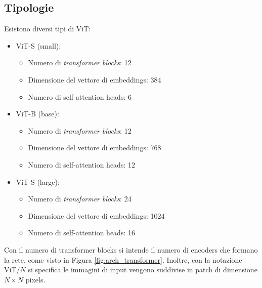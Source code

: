\subsection{Tipologie}
\label{tipologie_vit}
Esistono diversi tipi di ViT:
\begin{itemize}
    \item ViT-S (small):
    \begin{itemize}
        \item Numero di \textit{transformer blocks}: 12
        \item Dimensione del vettore di embeddings: 384
        \item Numero di self-attention heads: 6
    \end{itemize}
    \item ViT-B (base):
    \begin{itemize}
        \item Numero di \textit{transformer blocks}: 12
        \item Dimensione del vettore di embeddings: 768
        \item Numero di self-attention heads: 12
    \end{itemize}
    \item ViT-S (large):
    \begin{itemize}
        \item Numero di \textit{transformer blocks}: 24
        \item Dimensione del vettore di embeddings: 1024
        \item Numero di self-attention heads: 16
    \end{itemize}
\end{itemize}
Con il numero di transformer blocks si intende il numero di encoders che formano la rete, come visto in Figura \ref{fig:arch_transformer}. Inoltre, con la notazione ViT/\(N\) si specifica le immagini di input vengono suddivise in patch di dimensione \(N \times N \) pixels.